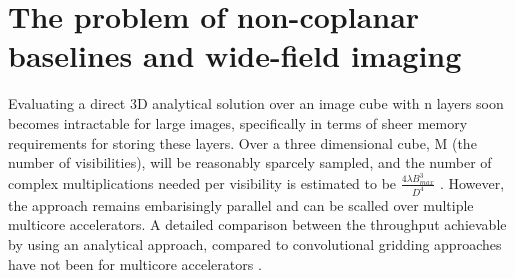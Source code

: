 \documentclass[a4paper,10pt]{report}
\begin{document}
 \section{The problem of non-coplanar baselines and wide-field imaging}
 Evaluating a direct 3D analytical solution over an image cube with n layers soon becomes intractable for large images, specifically in terms of sheer memory requirements for storing these layers. Over a three dimensional cube, M (the number of visibilities),
 will be reasonably sparcely sampled, and the number of complex multiplications needed per visibility is estimated to be $\frac{4\lambda B_{max}^3}{D^4}$ \cite{yashar2009tdp}. However, the approach remains embarisingly parallel and can
 be scalled over multiple multicore accelerators. A detailed comparison between the throughput achievable by using an analytical approach, compared to convolutional gridding approaches have not been for multicore accelerators \cite{hardy2013direct}.
 
 


\end{document}
